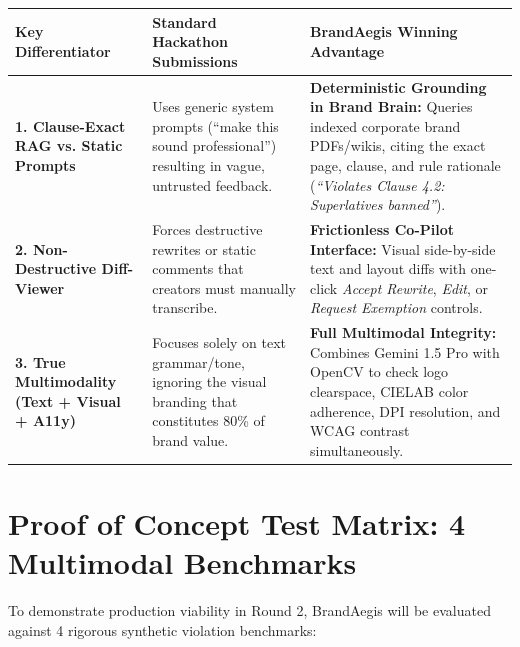 \documentclass[10pt,a4paper]{article}
\begin{document}
\begin{table}[h!]
\centering
\small
\renewcommand{\arraystretch}{1.25}
\begin{tabularx}{\textwidth}{p{3.2cm} p{5.2cm} X}
\toprule
\textbf{Key Differentiator} & \textbf{Standard Hackathon Submissions} & \textbf{BrandAegis Winning Advantage} \\
\midrule
\textbf{1. Clause-Exact RAG vs. Static Prompts} & 
Uses generic system prompts (``make this sound professional'') resulting in vague, untrusted feedback. & 
\textbf{Deterministic Grounding in Brand Brain:} Queries indexed corporate brand PDFs/wikis, citing the exact page, clause, and rule rationale (\textit{``Violates Clause 4.2: Superlatives banned''}). \\
\midrule
\textbf{2. Non-Destructive Diff-Viewer} & 
Forces destructive rewrites or static comments that creators must manually transcribe. & 
\textbf{Frictionless Co-Pilot Interface:} Visual side-by-side text and layout diffs with one-click \textit{Accept Rewrite}, \textit{Edit}, or \textit{Request Exemption} controls. \\
\midrule
\textbf{3. True Multimodality (Text + Visual + A11y)} & 
Focuses solely on text grammar/tone, ignoring the visual branding that constitutes 80\% of brand value. & 
\textbf{Full Multimodal Integrity:} Combines Gemini 1.5 Pro with OpenCV to check logo clearspace, CIELAB color adherence, DPI resolution, and WCAG contrast simultaneously. \\
\bottomrule
\end{tabularx}
\end{table}

\vspace{0.1cm}

\section{Proof of Concept Test Matrix: 4 Multimodal Benchmarks}

\small To demonstrate production viability in Round 2, BrandAegis will be evaluated against 4 rigorous synthetic violation benchmarks:

\vspace{0.1cm}
\end{document}
